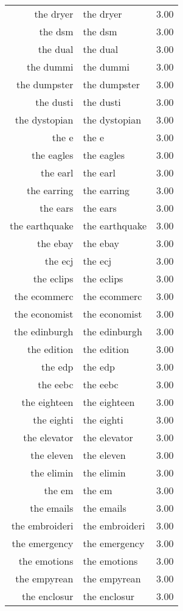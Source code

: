 \begin{table}[ht]
\begin{tabular}{rlr}
  the dryer & the dryer & 3.00 \\ 
  the dsm & the dsm & 3.00 \\ 
  the dual & the dual & 3.00 \\ 
  the dummi & the dummi & 3.00 \\ 
  the dumpster & the dumpster & 3.00 \\ 
  the dusti & the dusti & 3.00 \\ 
  the dystopian & the dystopian & 3.00 \\ 
  the e & the e & 3.00 \\ 
  the eagles & the eagles & 3.00 \\ 
  the earl & the earl & 3.00 \\ 
  the earring & the earring & 3.00 \\ 
  the ears & the ears & 3.00 \\ 
  the earthquake & the earthquake & 3.00 \\ 
  the ebay & the ebay & 3.00 \\ 
  the ecj & the ecj & 3.00 \\ 
  the eclips & the eclips & 3.00 \\ 
  the ecommerc & the ecommerc & 3.00 \\ 
  the economist & the economist & 3.00 \\ 
  the edinburgh & the edinburgh & 3.00 \\ 
  the edition & the edition & 3.00 \\ 
  the edp & the edp & 3.00 \\ 
  the eebc & the eebc & 3.00 \\ 
  the eighteen & the eighteen & 3.00 \\ 
  the eighti & the eighti & 3.00 \\ 
  the elevator & the elevator & 3.00 \\ 
  the eleven & the eleven & 3.00 \\ 
  the elimin & the elimin & 3.00 \\ 
  the em & the em & 3.00 \\ 
  the emails & the emails & 3.00 \\ 
  the embroideri & the embroideri & 3.00 \\ 
  the emergency & the emergency & 3.00 \\ 
  the emotions & the emotions & 3.00 \\ 
  the empyrean & the empyrean & 3.00 \\ 
  the enclosur & the enclosur & 3.00 \\ 

\end{tabular}
\end{table}
